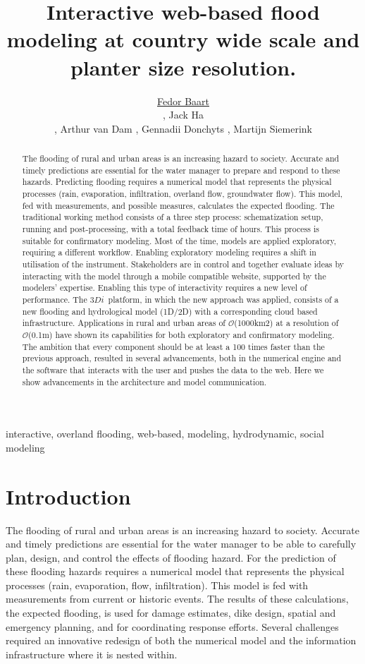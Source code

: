 \documentclass[a4paper]{article}
\title{Interactive web-based flood modeling at country wide scale and planter size resolution.}
\author{\underline{Fedor Baart}
  \address[A1]{\it{Deltares,
      Rotterdamseweg,
      Delft, The Netherlands (fedor.baart@deltares.nl, arthur.vandam@deltares.nl, gennadii.donchyts@deltares.nl)}},
  Jack Ha
  \address[B1]{\it{Nelen \& Schuurmans,
      Zakkendragerssteeg,
      Utrecht, The Netherlands (jack.ha@nelen-schuurmans.nl, martijn.siemerink@nelen-schuurmans.nl)}},
  Arthur van Dam \addressmark[A1],
  Gennadii Donchyts \addressmark[A1],
  Martijn Siemerink \addressmark[B1]
}
\DeclareRobustCommand{\orderof}{\ensuremath{\mathcal{O}}}
\DeclareRobustCommand{\threedi}{$3Di$~}
\begin{document}
\sffamily
\sansmath

\begin{abstract}
  The flooding of rural and urban areas is an increasing hazard to society. Accurate and timely predictions are essential for the water manager to prepare and respond to these hazards.
  Predicting flooding requires a numerical model that represents the physical processes (rain, evaporation, infiltration, overland flow, groundwater flow). This model, fed with measurements, and possible measures, calculates the expected flooding.
  The traditional working method consists of a three step process: schematization setup, running and post-processing, with a total feedback time of hours.  This process is suitable for confirmatory modeling. Most of the time, models are applied exploratory, requiring a different workflow.
  Enabling exploratory modeling requires a shift in utilisation of the instrument. Stakeholders are in control and together evaluate ideas by interacting with the model through a mobile compatible website, supported by the modelers’ expertise. Enabling this type of interactivity requires a new level of performance.
  The \threedi platform, in which the new approach was applied, consists of a new flooding and hydrological model (1D/2D) with a corresponding cloud based infrastructure. Applications in rural and urban areas of \orderof(1000km2) at a resolution of \orderof(0.1m) have shown its capabilities for both exploratory and confirmatory modeling.
  The ambition that every component should be at least a 100 times faster than the previous approach, resulted in several advancements, both in the numerical engine and the software that interacts with the user and pushes the data to the web. Here we show advancements in the architecture and model communication.

\end{abstract}
\begin{keyword}
  interactive, overland flooding, web-based, modeling, hydrodynamic, social modeling
\end{keyword}

\maketitle


\section{Introduction}
The flooding of rural and urban areas is an increasing hazard to society. Accurate and timely predictions are essential for the water manager to be able to carefully plan, design, and control the effects of flooding hazard.
For the prediction of these flooding hazards requires a numerical model that represents the physical processes (rain, evaporation, flow, infiltration). This model is fed with measurements from current or historic events. The results of these calculations, the expected flooding, is used for damage estimates, dike design, spatial and emergency planning, and for coordinating response efforts. Several challenges required an innovative redesign of both the numerical model and the information infrastructure where it is nested within.
\end{document}
